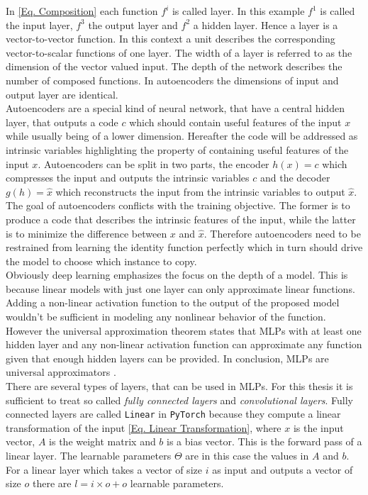 \documentclass[12pt, a4paper]{article}
\begin{document}
 In \cref{Eq. Composition} each function \(f^i\) is called layer. In this example \(f^1\) is called the input layer, \(f^3\) the output layer and \(f^2\) a hidden layer. Hence a layer is a vector-to-vector function. In this context a unit describes the corresponding vector-to-scalar functions of one layer. The width of a layer is referred to as the dimension of the vector valued input. The depth of the network describes the number of composed functions. In autoencoders the dimensions of input and output layer are identical.\\Autoencoders are a special kind of neural network, that have a central hidden layer, that outputs a code \(c\) which should contain useful features of the input \(x\) while usually being of a lower dimension. Hereafter the code will be addressed as intrinsic variables highlighting the property of containing useful features of the input \(x\). Autoencoders can be split in two parts, the encoder \(h(x) = c\) which compresses the input and outputs the intrinsic variables \(c\) and the decoder \(g(h) = \hat{x}\) which reconstructs the input from the intrinsic variables to output \(\hat{x}\). The goal of autoencoders conflicts with the training objective. The former is to produce a code that describes the intrinsic features of the input, while the latter is to minimize the difference between \(x\) and \(\hat{x}\). Therefore autoencoders need to be restrained from learning the identity function perfectly which in turn should drive the model to choose which instance to copy.\\
Obviously deep learning emphasizes the focus on the depth of a model. This is because linear models with just one layer can only approximate linear functions. Adding a non-linear activation function to the output of the proposed model wouldn't be sufficient in modeling any nonlinear behavior of the function. However the universal approximation theorem \cite{Hornik1989} states that MLPs with at least one hidden layer and any non-linear activation function can approximate any function given that enough hidden layers can be provided. In conclusion, MLPs are universal approximators \cite{Goodfellow}.\\
There are several types of layers, that can be used in MLPs. For this thesis it is sufficient to treat so called \textit{fully connected layers} and \textit{convolutional layers}.
Fully connected layers are called \texttt{Linear}\cite{bibid} in \texttt{PyTorch}\cite{bibid} because they compute a linear transformation of the input \cref{Eq. Linear Transformation}, where \(x\) is the input vector, \(A\) is the weight matrix and \(b\) is a bias vector. This is the forward pass of a linear layer. The learnable parameters \(\Theta\) are in this case the values in \(A\) and \(b\). For a linear layer which takes a vector of size \(i\) as input and outputs a vector of size \(o\) there are \(l = i \times o + o\) learnable parameters. 
\end{document}
